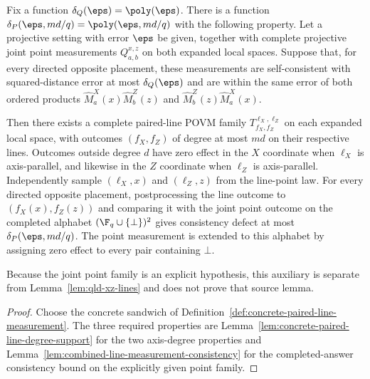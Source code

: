 \begin{example}
	\label{lem:combined-lines-given-points}
	\leanok
	Fix a function $\delta_Q(\eps)=\poly(\eps)$. There is a function
	$\delta_P(\eps,md/q)=\poly(\eps,md/q)$ with the following property. Let a
	projective setting with error $\eps$ be given, together with complete
	projective joint point measurements $Q^{x,z}_{a,b}$ on both expanded local
	spaces. Suppose that, for every directed opposite placement, these
	measurements are self-consistent with squared-distance error at most
	$\delta_Q(\eps)$ and are within the same error of both ordered products
	$\hat M^X_a(x)\hat M^Z_b(z)$ and
	$\hat M^Z_b(z)\hat M^X_a(x)$.

	Then there exists a complete paired-line POVM family
	$T^{\ell_X,\ell_Z}_{f_X,f_Z}$ on each expanded local space, with outcomes
	$(f_X,f_Z)$ of degree at most $md$ on their respective lines. Outcomes outside
	degree $d$ have zero effect in the $X$ coordinate when $\ell_X$ is
	axis-parallel, and likewise in the $Z$ coordinate when $\ell_Z$ is
	axis-parallel. Independently sample $(\ell_X,x)$ and $(\ell_Z,z)$ from the
	line-point law. For every directed opposite placement, postprocessing the line
	outcome to $(f_X(x),f_Z(z))$ and comparing it with the joint point outcome on
	the completed alphabet $(\F_q\cup\{\bot\})^2$ gives consistency defect at most
	$\delta_P(\eps,md/q)$. The point measurement is extended to this alphabet by
	assigning zero effect to every pair containing $\bot$.

	Because the joint point family is an explicit hypothesis, this auxiliary is
	separate from Lemma~\ref{lem:qld-xz-lines} and does not prove that source
	lemma.
\end{example}
\begin{proof}
	\leanok
	Choose the concrete sandwich of
	Definition~\ref{def:concrete-paired-line-measurement}. The three required
	properties are
	Lemma~\ref{lem:concrete-paired-line-degree-support} for the two axis-degree
	properties and Lemma~\ref{lem:combined-line-measurement-consistency} for the
	completed-answer consistency bound on the explicitly given point family.
\end{proof}

